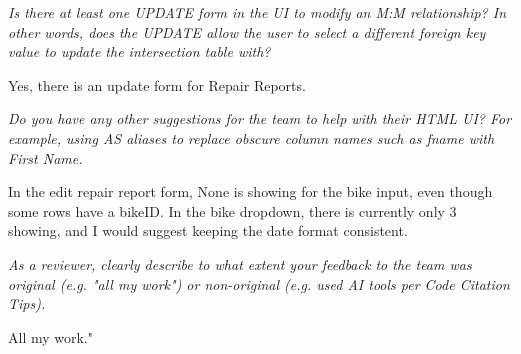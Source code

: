 \documentclass{article}
\begin{document}
\begin{tcolorbox}[colback=secondarycolor, colframe=primarycolor, title=\textbf{Step 3: Peer Review 3 - Fidella Wu}]
\vspace{0.2cm}
\textit{Is there at least one UPDATE form in the UI to modify an M:M relationship? In other words, does the UPDATE allow the user to select a different foreign key value to update the intersection table with?}

\vspace{0.05cm}
Yes, there is an update form for Repair Reports.

\vspace{0.2cm}
\textit{Do you have any other suggestions for the team to help with their HTML UI? For example, using AS aliases to replace obscure column names such as fname with First Name.}

\vspace{0.05cm}
In the edit repair report form, None is showing for the bike input, even though some rows have a bikeID. In the bike dropdown, there is currently only 3 showing, and I would suggest keeping the date format consistent.

\vspace{0.2cm}
\textit{As a reviewer, clearly describe to what extent your feedback to the team was original (e.g. "all my work") or non-original (e.g. used AI tools per Code Citation Tips). }

\vspace{0.05cm}
All my work."

\end{tcolorbox}
\end{document}
